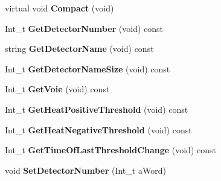 \begin{DoxyCompactItemize}
\item 
\hypertarget{class_edw_single_bolo_sub_record_base_a4d0d4d58b09764979b54e172f1e81d68}{
virtual void {\bfseries Compact} (void)}
\label{class_edw_single_bolo_sub_record_base_a4d0d4d58b09764979b54e172f1e81d68}

\item 
\hypertarget{class_edw_single_bolo_sub_record_base_a75c0c621fbbe2ee8bed17bedad319452}{
Int\_\-t {\bfseries GetDetectorNumber} (void) const }
\label{class_edw_single_bolo_sub_record_base_a75c0c621fbbe2ee8bed17bedad319452}

\item 
\hypertarget{class_edw_single_bolo_sub_record_base_ad62649875d4234c08c713a5d74d68fc8}{
string {\bfseries GetDetectorName} (void) const }
\label{class_edw_single_bolo_sub_record_base_ad62649875d4234c08c713a5d74d68fc8}

\item 
\hypertarget{class_edw_single_bolo_sub_record_base_a1b54b2c558986f8c2105c306e529f164}{
Int\_\-t {\bfseries GetDetectorNameSize} (void) const }
\label{class_edw_single_bolo_sub_record_base_a1b54b2c558986f8c2105c306e529f164}

\item 
\hypertarget{class_edw_single_bolo_sub_record_base_ae624b049bc0e78f9955eae0b7d9328eb}{
Int\_\-t {\bfseries GetVoie} (void) const }
\label{class_edw_single_bolo_sub_record_base_ae624b049bc0e78f9955eae0b7d9328eb}

\item 
\hypertarget{class_edw_single_bolo_sub_record_base_ac20a95269ef4aab93d70c8c06a0e137e}{
Int\_\-t {\bfseries GetHeatPositiveThreshold} (void) const }
\label{class_edw_single_bolo_sub_record_base_ac20a95269ef4aab93d70c8c06a0e137e}

\item 
\hypertarget{class_edw_single_bolo_sub_record_base_a52a59ec9ed36f05decd2e594932b59e8}{
Int\_\-t {\bfseries GetHeatNegativeThreshold} (void) const }
\label{class_edw_single_bolo_sub_record_base_a52a59ec9ed36f05decd2e594932b59e8}

\item 
\hypertarget{class_edw_single_bolo_sub_record_base_a641a2a298dab33dbd893626b37460bfa}{
Int\_\-t {\bfseries GetTimeOfLastThresholdChange} (void) const }
\label{class_edw_single_bolo_sub_record_base_a641a2a298dab33dbd893626b37460bfa}

\item 
\hypertarget{class_edw_single_bolo_sub_record_base_a31541fd131e7490451216559a9e11de2}{
void {\bfseries SetDetectorNumber} (Int\_\-t aWord)}
\label{class_edw_single_bolo_sub_record_base_a31541fd131e7490451216559a9e11de2}


\end{DoxyCompactItemize}
